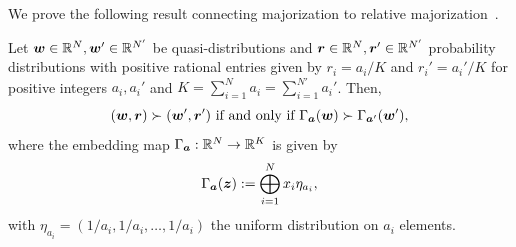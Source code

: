 \documentclass[pra,
aps,
twocolumn,
superscriptaddress,
groupedaddress,
nofootinbib,
reprint
]{revtex4-1}
\begin{document}
We prove the following result connecting majorization to relative majorization~\cite{cit:horodecki2, Brandao_2015,  cit:lostaglio}.
\begin{lemma}
	Let $\boldsymbol{w}\in \mathbb{R}^N, \boldsymbol{w}'\in \mathbb{R}^{N'}$ be quasi-distributions and $\boldsymbol{r}\in \mathbb{R}^N, \boldsymbol{r}'\in \mathbb{R}^{N'}$ probability distributions with positive rational entries given by $r_i = a_i/K$ and $r_i' = a_i'/K$ for positive integers $a_i, a_i'$ and $K = \sum_{i=1}^N a_i = \sum_{i=1}^{N'} a_i'$. 
Then,
\begin{equation}
(\boldsymbol{w}, \boldsymbol{r}) \succ (\boldsymbol{w}', \boldsymbol{r}') \mbox{ if and only if } \Gamma_{\bm{a}} (\boldsymbol{w}) \succ \Gamma_{\bm{a}'} (\boldsymbol{w}'),
\end{equation}
where the embedding map $\Gamma_{\bm{a}} :\mathbb{R}^N \rightarrow \mathbb{R}^K$ is given by
\begin{equation}
	\Gamma_{\bm{a}}(\bm{z}) := \bigoplus_{i=1}^N x_i \eta_{a_i},
\end{equation}
with $\eta_{a_i} = (1/a_i, 1/a_i, \dots, 1/a_i)$ the uniform distribution on $a_i$ elements.
\end{lemma}
\end{document}
